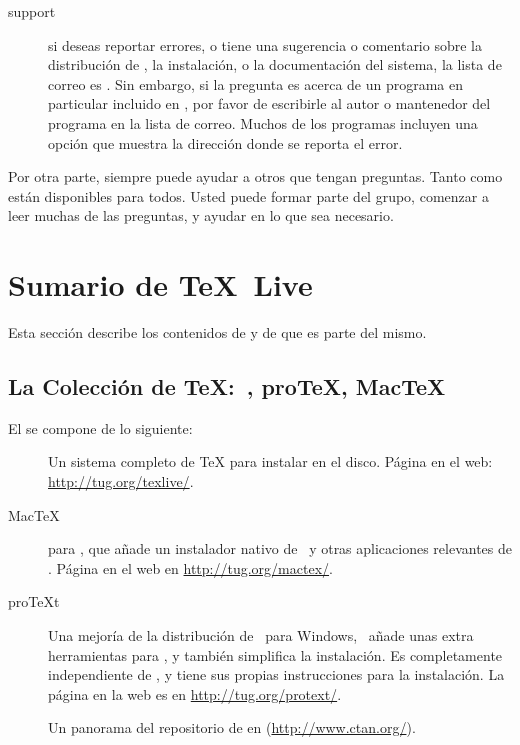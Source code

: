 \documentclass{article}
\begin{document}
\begin{description}
\item [\TL{} support] si deseas reportar errores, o tiene una sugerencia
	o comentario sobre la distribución de \TL{}, la instalación, o
	la documentación del sistema, la lista de correo es
	. Sin embargo, si la pregunta es
	acerca de un programa en particular incluido en \TL{}, por
	favor de escribirle al autor o mantenedor del programa en la
	lista de correo. Muchos de los programas incluyen una opción
	 que muestra la dirección donde se reporta el
	error. 

\end{description}

Por otra parte, siempre puede ayudar a otros que tengan preguntas.
Tanto  como  están disponibles
para todos. Usted puede formar parte del grupo, comenzar a leer muchas
de las preguntas, y ayudar en lo que sea necesario. 


\section{Sumario de \protect\TeX\protect\ Live}
\label{sec:overview-tl}

Esta sección describe los contenidos de \TL{} y de \TK{} que es parte
del mismo.

\subsection{La Colección de \protect\TeX\protect:~\TL{}, pro\TeX{}, Mac\TeX}
\label{sec:tl-coll-dists}

El \TK{} \DVD{} se compone de lo siguiente:

\begin{description}

\item [\TL] Un sistema completo de \TeX{} para instalar en el disco.
	Página en el web: \url{http://tug.org/texlive/}.

\item [Mac\TeX] para \MacOSX, que añade un instalador nativo de
	\MacOSX\ y otras aplicaciones relevantes de \TL{}. Página en
	el web en \url{http://tug.org/mactex/}.

\item [pro\TeX{}t] Una mejoría de la distribución de \MIKTEX\ para
	Windows, \ProTeXt\ añade unas extra herramientas para \MIKTEX,
	y también simplifica la instalación. Es completamente
	independiente de \TL{}, y tiene sus propias instrucciones para
	la instalación. La página en la web es en
	\url{http://tug.org/protext/}.

\item [\CTAN{}] Un panorama del repositorio de \CTAN{} en
	(\url{http://www.ctan.org/}).

\end{description}
\end{document}

